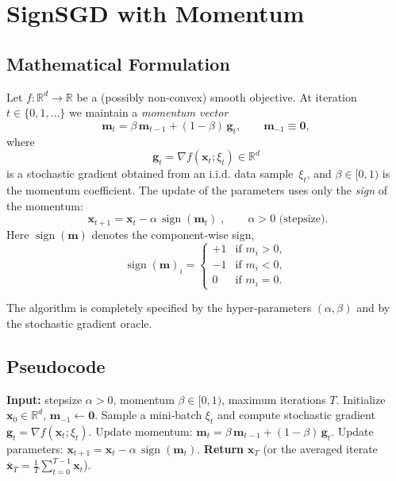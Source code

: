 \documentclass{article}
\newcommand{\sign}{\operatorname{sign}}
\newcommand{\R}{\mathbb{R}}
\begin{document}
\section*{SignSGD with Momentum}

\subsection*{Mathematical Formulation}
Let $f:\R^{d}\rightarrow\R$ be a (possibly non‑convex) smooth objective.  
At iteration $t\in\{0,1,\dots\}$ we maintain a \emph{momentum vector}
\[
\bm{m}_{t}= \beta\,\bm{m}_{t-1}+ (1-\beta)\,\bm{g}_{t},
\qquad \bm{m}_{-1}\equiv \bm{0},
\tag{1}
\]
where
\[
\bm{g}_{t}= \nabla f(\bm{x}_{t};\xi_{t})\in\R^{d}
\]
is a stochastic gradient obtained from an i.i.d. data sample~$\xi_{t}$, and
$\beta\in[0,1)$ is the momentum coefficient.  
The update of the parameters uses only the \emph{sign} of the momentum:
\[
\boxed{\;
\bm{x}_{t+1}= \bm{x}_{t}-\alpha\,\sign(\bm{m}_{t})\;},
\qquad \alpha>0 \text{ (stepsize)}.
\tag{2}
\]
Here $\sign(\bm{m})$ denotes the component‑wise sign,
\[
\sign(\bm{m})_{i}= 
\begin{cases}
+1 & \text{if } m_{i}>0,\\[2mm]
-1 & \text{if } m_{i}<0,\\[2mm]
0  & \text{if } m_{i}=0 .
\end{cases}
\]

The algorithm is completely specified by the hyper‑parameters
$(\alpha,\beta)$ and by the stochastic gradient oracle.

\subsection*{Pseudocode}
\begin{algorithm}[H]
\caption{SignSGD with Momentum}
\begin{algorithmic}[1]
\STATE \textbf{Input:} stepsize $\alpha>0$, momentum $\beta\in[0,1)$,
        maximum iterations $T$.
\STATE Initialize $\bm{x}_{0}\in\R^{d}$, $\bm{m}_{-1}\gets\bm{0}$.
    \STATE Sample a mini‑batch $\xi_{t}$ and compute stochastic gradient
          $\bm{g}_{t}= \nabla f(\bm{x}_{t};\xi_{t})$.
    \STATE Update momentum:
          $\displaystyle \bm{m}_{t}= \beta\,\bm{m}_{t-1}+ (1-\beta)\,\bm{g}_{t}$.
    \STATE Update parameters:
          $\displaystyle \bm{x}_{t+1}= \bm{x}_{t}-\alpha\,\sign(\bm{m}_{t})$.
\ENDFOR
\STATE \textbf{Return} $\bm{x}_{T}$ (or the averaged iterate $\bar{\bm{x}}_{T}=\tfrac1T\sum_{t=0}^{T-1}\bm{x}_{t}$).
\end{algorithmic}
\end{algorithm}
\end{document}
